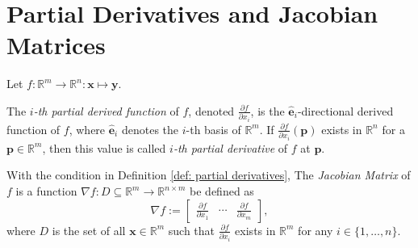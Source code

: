 


\section{Partial Derivatives and Jacobian Matrices}


\begin{definition}
	\label{def: partial derivatives}
	
	Let $f: \mathbb R^m \to \mathbb R^n: \mathbf x \mapsto \mathbf y$. 
	
	The \textit{$i$-th partial derived function} of $f$, denoted $\frac{\partial f}{\partial x_i}$, is the $\mathbf{\hat e}_i$-directional derived function of $f$, where $\mathbf{\hat e}_i$ denotes the $i$-th basis of $\mathbb R^m$. If $\frac{\partial f}{\partial x_i}(\mathbf p)$ exists in $\mathbb R^n$ for a $\mathbf p \in \mathbb R^m$, then this value is called \textit{$i$-th partial derivative} of $f$ at $\mathbf p$.
\end{definition}


\begin{definition}
	\label{def: jacobian matrices}
	
	With the condition in Definition \ref{def: partial derivatives}, The \textit{Jacobian Matrix} of $f$ is a function $\nabla f: D \subseteq \mathbb R^m \to \mathbb R^{n \times m}$ be defined as
	$$
	\nabla f :=
	\left[
	\begin{matrix}
		\displaystyle \frac{\partial f}{\partial x_1} & \cdots & \displaystyle \frac{\partial f}{\partial x_m}
	\end{matrix}
	\right],
	$$
	where $D$ is the set of all $\mathbf x \in \mathbb R^m$ such that $\frac{\partial f}{\partial x_i}$ exists in $\mathbb R^m$ for any $i \in \{1, \ldots, n\}$.
\end{definition}


